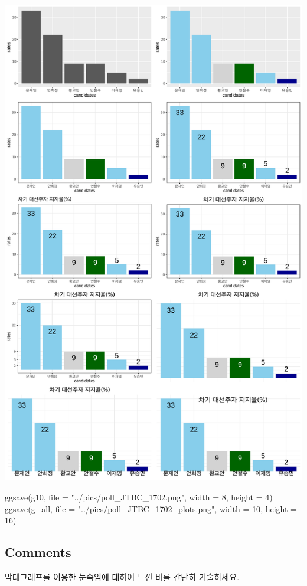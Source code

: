 \documentclass[
]{article}
\newenvironment{Shaded}{}{}
\newcommand{\AttributeTok}[1]{\textcolor[rgb]{0.49,0.56,0.16}{#1}}
\newcommand{\DecValTok}[1]{\textcolor[rgb]{0.25,0.63,0.44}{#1}}
\newcommand{\FunctionTok}[1]{\textcolor[rgb]{0.02,0.16,0.49}{#1}}
\newcommand{\NormalTok}[1]{#1}
\newcommand{\StringTok}[1]{\textcolor[rgb]{0.25,0.44,0.63}{#1}}
\begin{document}
\includegraphics{poll_JTBC_1702_pdf_files/figure-latex/unnamed-chunk-9-1.pdf}

\begin{Shaded}
\begin{Highlighting}[]
\FunctionTok{ggsave}\NormalTok{(g10, }\AttributeTok{file =} \StringTok{"../pics/poll\_JTBC\_1702.png"}\NormalTok{, }\AttributeTok{width =} \DecValTok{8}\NormalTok{, }\AttributeTok{height =} \DecValTok{4}\NormalTok{)}
\FunctionTok{ggsave}\NormalTok{(g\_all, }\AttributeTok{file =} \StringTok{"../pics/poll\_JTBC\_1702\_plots.png"}\NormalTok{, }\AttributeTok{width =} \DecValTok{10}\NormalTok{, }\AttributeTok{height =} \DecValTok{16}\NormalTok{)}
\end{Highlighting}
\end{Shaded}

\subsection{Comments}\label{comments}

막대그래프를 이용한 눈속임에 대하여 느낀 바를 간단히 기술하세요.
\end{document}
